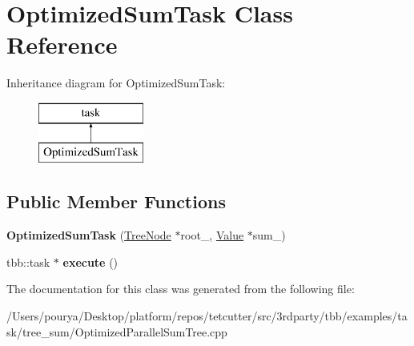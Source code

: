 \hypertarget{classOptimizedSumTask}{}\section{Optimized\+Sum\+Task Class Reference}
\label{classOptimizedSumTask}
Inheritance diagram for Optimized\+Sum\+Task\+:\begin{figure}[H]
\begin{center}
\leavevmode
\includegraphics[height=2.000000cm]{classOptimizedSumTask}
\end{center}
\end{figure}
\subsection*{Public Member Functions}
\begin{DoxyCompactItemize}
\item 
\hypertarget{classOptimizedSumTask_aa0604827b9efc8064a8f0350f2f9f063}{}{\bfseries Optimized\+Sum\+Task} (\hyperlink{structTreeNode}{Tree\+Node} $\ast$root\+\_\+, \hyperlink{structValue}{Value} $\ast$sum\+\_\+)\label{classOptimizedSumTask_aa0604827b9efc8064a8f0350f2f9f063}

\item 
\hypertarget{classOptimizedSumTask_a1ac871fd3f06ec4ba3397ea8a8df48f3}{}tbb\+::task $\ast$ {\bfseries execute} ()\label{classOptimizedSumTask_a1ac871fd3f06ec4ba3397ea8a8df48f3}

\end{DoxyCompactItemize}


The documentation for this class was generated from the following file\+:\begin{DoxyCompactItemize}
\item 
/\+Users/pourya/\+Desktop/platform/repos/tetcutter/src/3rdparty/tbb/examples/task/tree\+\_\+sum/Optimized\+Parallel\+Sum\+Tree.\+cpp\end{DoxyCompactItemize}
